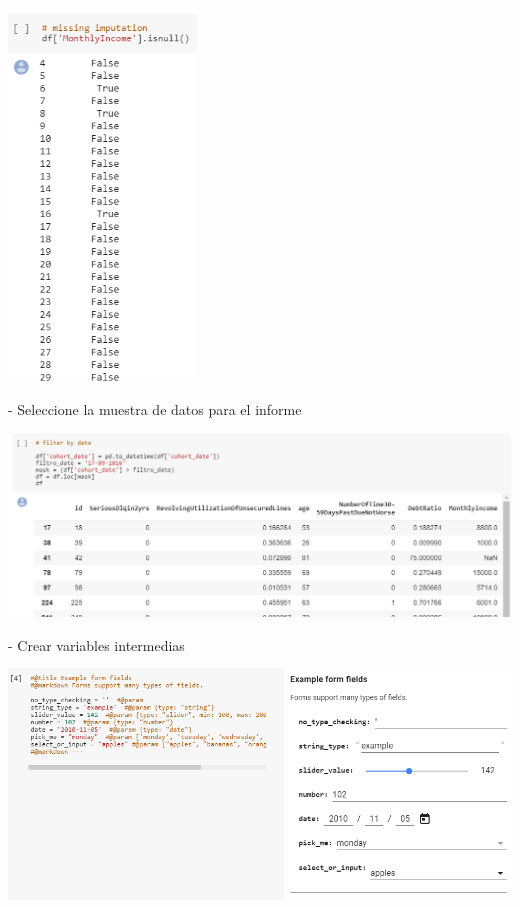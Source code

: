 \documentclass[12pt,letterpaper]{article}
\begin{document}
\begin{center}
\includegraphics[width=5cm]{IMG/7.png} 
\end{center}

- Seleccione la muestra de datos para el informe

\begin{center}
\includegraphics[width=15cm]{IMG/8.png} 
\end{center}

- Crear variables intermedias

\begin{center}
\includegraphics[width=15cm]{IMG/9.png} 
\end{center}
\end{document}
